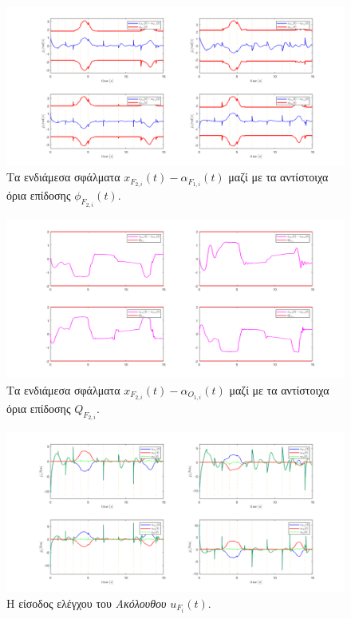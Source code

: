 \begin{figure}[H]
    \centering
    \includegraphics[width=1\linewidth]{Chapters/Chapter3/Figures/Sim2Fig4.png}
    \caption{Τα ενδιάμεσα σφάλματα $x_{F_{2,i}}(t) - \alpha_{F_{1,i}}(t)$ μαζί με τα αντίστοιχα όρια επίδοσης $\phi_{F_{2,i}}(t)$.}
    \label{Sim2Fig4}
\end{figure}

\begin{figure}[H]
    \centering
    \includegraphics[width=1\linewidth]{Chapters/Chapter3/Figures/Sim2Fig5.png}
    \caption{Τα ενδιάμεσα σφάλματα $x_{F_{2,i}}(t) - \alpha_{O_{1,i}}(t)$ μαζί με τα αντίστοιχα όρια επίδοσης $Q_{F_{2,i}}$.}
    \label{Sim2Fig5}
\end{figure}



\begin{figure}[H]
    \centering
    \includegraphics[width=1\linewidth]{Chapters/Chapter3/Figures/Sim2Fig6.png}
    \caption{Η είσοδος ελέγχου του \textit{Ακόλουθου} $u_{F_{i}}(t)$.}
    \label{Sim2Fig6}
\end{figure}

